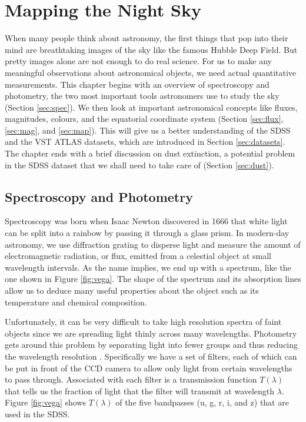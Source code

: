 
\chapter{Mapping the Night Sky}
\label{cha:astro}

When many people think about astronomy, the first things that pop into their mind are breathtaking
images of the sky like the famous Hubble Deep Field. But pretty images alone are not enough to do
real science. For us to make any meaningful observations about astronomical objects, we need actual
quantitative measurements. This chapter begins with an overview of spectroscopy and photometry, the
two most important tools astronomers use to study the sky (Section \ref{sec:spec}). We then look at
important astronomical concepts like fluxes, magnitudes, colours, and the equatorial coordinate
system (Section \ref{sec:flux}, \ref{sec:mag}, and \ref{sec:map}). This will give us a better
understanding of the SDSS and the VST ATLAS datasets, which are introduced in Section
\ref{sec:datasets}. The chapter ends with a brief discussion on dust extinction, a
potential problem in the SDSS dataset that we shall need to take care of (Section \ref{sec:dust}).


\section{Spectroscopy and Photometry}  
\label{sec:spec}

Spectroscopy was born when Isaac Newton discovered in 1666 that white light can be split into a
rainbow by passing it through a glass prism. In modern-day astronomy, we use diffraction grating to
disperse light and measure the amount of electromagnetic radiation, or flux, emitted from a
celestial object at small wavelength intervals. As the name implies, we end up with a spectrum,
like the one shown in Figure \ref{fig:vega}. The shape of the spectrum and its absorption lines
allow us to deduce many useful properties about the object such as its temperature and chemical
composition.

Unfortunately, it can be very difficult to take high resolution spectra of faint objects since we
are spreading light thinly across many wavelengths. Photometry gets around this problem by
separating light into fewer groups and thus reducing the wavelength resolution \cite[Chapter
1]{romanishin02}. Specifically we have a set of filters, each of which can be put in front of the
CCD camera to allow only light from certain wavelengths to pass through. Associated with each
filter is a transmission function $T(\lambda)$ that tells us the fraction of light that the filter
will transmit at wavelength $\lambda$. Figure \ref{fig:vega} shows $T(\lambda)$ of the five
bandpasses (u, g, r, i, and z) that are used in the SDSS.

